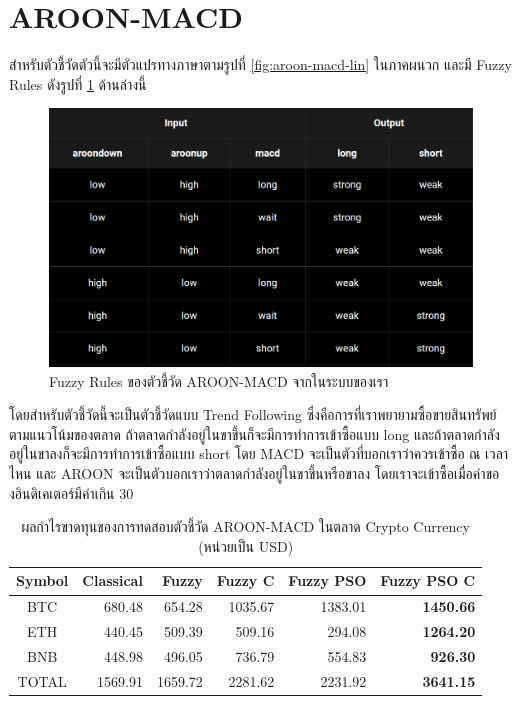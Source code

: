 \section{AROON-MACD}
สำหรับตัวชี้วัดตัวนี้จะมีตัวแปรทางภาษาตามรูปที่ \ref{fig:aroon-macd-lin} ในภาคผนวก และมี Fuzzy Rules ดังรูปที่ \ref{fig:aroon-macd-rules} ด้านล่างนี้
\begin{figure}[!ht]
    \centering
    \includegraphics[width=\textwidth]{images/aroon-macd-rules.png}
    \caption{Fuzzy Rules ของตัวชี้วัด AROON-MACD จากในระบบของเรา}
    \label{fig:aroon-macd-rules}
\end{figure}

โดยสำหรับตัวชี้วัดนี้จะเป็นตัวชี้วัดแบบ Trend Following ซึ่งคือการที่เราพยายามซื้อขายสินทรัพย์ตามแนวโน้มของตลาด ถ้าตลาดกำลังอยู่ในขาขึ้นก็จะมีการทำการเข้าซื้อแบบ long และถ้าตลาดกำลังอยู่ในขาลงก็จะมีการทำการเข้าซื้อแบบ short โดย MACD จะเป็นตัวที่บอกเราว่าควรเข้าซื้อ ณ เวลาไหน และ AROON จะเป็นตัวบอกเราว่าตลาดกำลังอยู่ในขาขึ้นหรือขาลง โดยเราจะเข้าซื้อเมื่อค่าของอินดิเคเตอร์มีค่าเกิน 30

\begin{table}[!h]
    \centering
    \begin{tabular}{crrrrr}
        \hline
        \textbf{Symbol} & \textbf{Classical} & \textbf{Fuzzy} & \textbf{Fuzzy C} & \textbf{Fuzzy PSO} & \textbf{Fuzzy PSO C} \\ \hline
        BTC             & 680.48             & 654.28         & 1035.67          & 1383.01            & \textbf{1450.66}     \\ \hline
        ETH             & 440.45             & 509.39         & 509.16           & 294.08             & \textbf{1264.20}     \\ \hline
        BNB             & 448.98             & 496.05         & 736.79           & 554.83             & \textbf{926.30}      \\ \hline
        TOTAL           & 1569.91            & 1659.72        & 2281.62          & 2231.92            & \textbf{3641.15}     \\ \hline
    \end{tabular}
    \caption{ผลกำไรขาดทุนของการทดสอบตัวชี้วัด AROON-MACD ในตลาด Crypto Currency (หน่วยเป็น USD)}
    \label{tab:aroon-macd-crypto}
\end{table}

